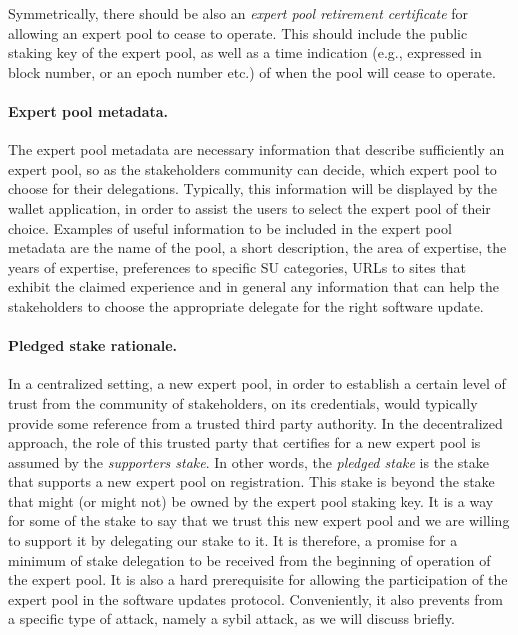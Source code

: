 Symmetrically, there should be also an \emph{expert pool retirement certificate} for allowing an expert pool to cease to operate. This should include the public staking key of the expert pool, as well as a time indication (e.g., expressed in block number, or an epoch number etc.) of when the pool will cease to operate.

\paragraph{Expert pool metadata.}
The expert pool metadata are necessary information that describe sufficiently an expert pool, so as the stakeholders community can decide, which expert pool to choose for their delegations. Typically, this information will be displayed by the wallet application, in order to assist the users to select the expert pool of their choice. Examples of useful information to be included in the expert pool metadata are the name of the pool, a short description, the area of expertise, the years of expertise, preferences to specific SU categories, URLs to sites that exhibit the claimed experience and in general any information that can help the stakeholders to choose the appropriate delegate for the right software update.

\paragraph{Pledged stake rationale.}
In a centralized setting, a new expert pool, in order to establish a certain level of trust from the community of stakeholders, on its credentials, would typically provide some reference from a trusted third party authority. In the decentralized approach, the role of this trusted party that certifies for a new expert pool is assumed by the \emph{supporters stake}. In other words, the \emph{pledged stake} is the stake that supports a new expert pool on registration. This stake is beyond the stake that might (or might not) be owned by the expert pool staking key. It is a way for some of the stake to say that we trust this new expert pool and we are willing to support it by delegating our stake to it. It is therefore, a promise for a minimum of stake delegation to be received from the beginning of operation of the expert pool. It is also a hard prerequisite for allowing the participation of the expert pool in the software updates protocol. Conveniently, it also prevents from a specific type of attack, namely a sybil attack, as we will discuss briefly.

